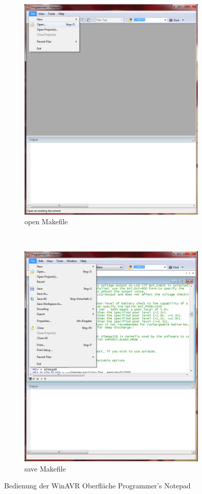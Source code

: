 \begin{figure}[H]
  \begin{subfigure}[b]{9cm}
    \centering
    \includegraphics[width=9cm]{../PNG/Notepad_open.png}
    \caption{open Makefile}
  \end{subfigure}
  ~
  \begin{subfigure}[b]{9cm}
    \centering
    \includegraphics[width=9cm]{../PNG/Notepad_save.png}
    \caption{save Makefile}
  \end{subfigure}
  \caption{Bedienung der WinAVR Oberfläche Programmer's Notepad}
  \label{fig:WinAVR1}
\end{figure}

